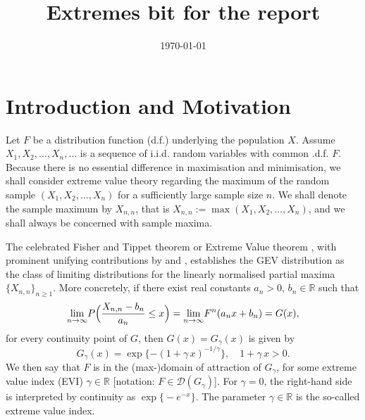\documentclass[10pt, a4paper, oneside]{article}
\title{Extremes bit for the report}
\date{\today}
\newcommand{\field}[1]{\mathbb{#1}}
\newcommand{\real}{\ensuremath{{\field{R}}}}
\newcommand{\limit}[1]{\ensuremath{\displaystyle {\lim_{#1 \rightarrow{\infty}}}}}
\begin{document}
\maketitle

\strut








\section{Introduction and Motivation}
\label{Sec.Intro}

Let $F$ be a distribution function (d.f.) underlying the population $X$. Assume $X_1,X_2, \ldots, X_n, \ldots$ is a sequence of i.i.d. random variables with common .d.f. $F$. Because there is no essential difference in maximisation and minimisation, we shall consider extreme value theory regarding the maximum of the random sample $(X_1,X_2, \ldots, X_n)$ for a sufficiently large sample size $n$. We shall denote the sample maximum by $X_{n,n}$, that is $X_{n,n}:= \max(X_1,X_2, \ldots, X_n)$, and we shall always be concerned with sample maxima.

The celebrated Fisher and Tippet theorem or Extreme Value theorem \citet{FisherTippett:28}, with prominent unifying contributions by \citet{Gnedenko:43} and \citet{deHaan:70}, establishes the GEV distribution as the class of limiting distributions for the linearly normalised partial maxima $\{X_{n,n} \}_{n\geq 1}$. More concretely, if there exist real constants $a_n>0$, $b_n \in \real$ such that
\begin{equation}\label{EVTheo}
	\limit{n} P \Bigl( \frac{X_{n,n}-b_n}{a_n} \leq x\Bigr)= \limit{n} F^n (a_n x + b_n) = G(x),
\end{equation}
for every continuity point of $G$, then $G(x)= G_{\gamma}(x)$ is given by
\begin{equation}\label{GEVd}
	G_{\gamma}(x)= \exp \{ -(1+ \gamma\, x)^{-1/\gamma}\}, \quad 1+\gamma\,x >0.
\end{equation}
We then say that $F$ is in the (max-)domain of attraction of $G_\gamma$,  for some extreme value index (EVI) $\gamma \in \real$ [notation: $F \in \mathcal{D}(G_{\gamma}) $]. For $\gamma=0$, the right-hand side is interpreted by continuity as $\exp\bigl\{-e^{-x}\bigr\}$. The parameter $\gamma \in \real$ is the so-called extreme value index.
\end{document}
